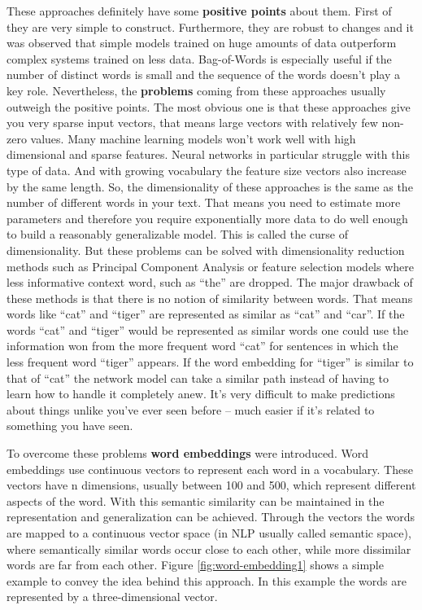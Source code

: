 \documentclass[]{krantz}
\begin{document}
These approaches definitely have some \textbf{positive points} about them. First of they are very simple to construct. Furthermore, they are robust to changes and it was observed that simple models trained on huge amounts of data outperform complex systems trained on less data. Bag-of-Words is especially useful if the number of distinct words is small and the sequence of the words doesn't play a key role.
Nevertheless, the \textbf{problems} coming from these approaches usually outweigh the positive points. The most obvious one is that these approaches give you very sparse input vectors, that means large vectors with relatively few non-zero values. Many machine learning models won't work well with high dimensional and sparse features. Neural networks in particular struggle with this type of data. And with growing vocabulary the feature size vectors also increase by the same length. So, the dimensionality of these approaches is the same as the number of different words in your text. That means you need to estimate more parameters and therefore you require exponentially more data to do well enough to build a reasonably generalizable model. This is called the curse of dimensionality. But these problems can be solved with dimensionality reduction methods such as Principal Component Analysis or feature selection models where less informative context word, such as ``the'' are dropped.
The major drawback of these methods is that there is no notion of similarity between words. That means words like ``cat'' and ``tiger'' are represented as similar as ``cat'' and ``car''. If the words ``cat'' and ``tiger'' would be represented as similar words one could use the information won from the more frequent word ``cat'' for sentences in which the less frequent word ``tiger'' appears. If the word embedding for ``tiger'' is similar to that of ``cat'' the network model can take a similar path instead of having to learn how to handle it completely anew. It's very difficult to make predictions about things unlike you've ever seen before -- much easier if it's related to something you have seen.

To overcome these problems \textbf{word embeddings} were introduced. Word embeddings use continuous vectors to represent each word in a vocabulary. These vectors have n dimensions, usually between 100 and 500, which represent different aspects of the word. With this semantic similarity can be maintained in the representation and generalization can be achieved. Through the vectors the words are mapped to a continuous vector space (in NLP usually called semantic space), where semantically similar words occur close to each other, while more dissimilar words are far from each other. Figure \ref{fig:word-embedding1} shows a simple example to convey the idea behind this approach. In this example the words are represented by a three-dimensional vector.
\end{document}
